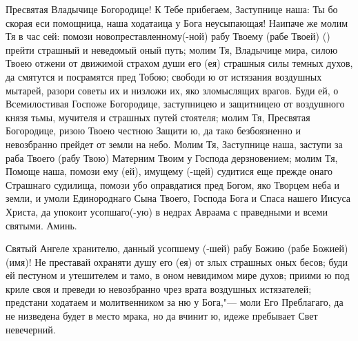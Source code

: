 \mychapterending

\begin{mymulticols}
 

Пресвятая Владычице Богородице! К Тебе прибегаем, Заступнице наша: Ты бо скорая еси помощница, наша ходатаица у Бога неусыпающая! Наипаче же молим Тя в час сей: помози новопреставленному(-ной) рабу Твоему (рабе Твоей) () прейти страшный и неведомый оный путь; молим Тя, Владычице мира, силою Твоею отжени от движимой страхом души его (ея) страшныя силы темных духов, да смятутся и посрамятся пред Тобою; свободи ю от истязания воздушных мытарей, разори советы их и низложи их, яко зломыслящих врагов. Буди ей, о Всемилостивая Госпоже Богородице, заступницею и защитницею от воздушного князя тьмы, мучителя и страшных путей стоятеля; молим Тя, Пресвятая Богородице, ризою Твоею честною Защити ю, да тако безбоязненно и невозбранно прейдет от земли на небо. Молим Тя, Заступнице наша, заступи за раба Твоего (рабу Твою) Матерним Твоим у Господа дерзновением; молим Тя, Помоще наша, помози ему (ей), имущему (-щей) судитися еще прежде онаго Страшнаго судилища, помози убо оправдатися пред Богом, яко Творцем неба и земли, и умоли Единороднаго Сына Твоего, Господа Бога и Спаса нашего Иисуса Христа, да упокоит усопшаго(-ую) в недрах Авраама с праведными и всеми святыми. Аминь.

\end{mymulticols}

\mychapterending

\begin{mymulticols}
 

Святый Ангеле хранителю, данный усопшему (-шей) рабу Божию (рабе Божией) (имя)! Не преставай охраняти душу его (ея) от злых страшных оных бесов; буди ей пестуном и утешителем и тамо, в оном невидимом мире духов; приими ю под криле своя и преведи ю невозбранно чрез врата воздушных истязателей; предстани ходатаем и молитвенником за ню у Бога,"--- моли Его Преблагаго, да не низведена будет в место мрака, но да вчинит ю, идеже пребывает Свет невечерний. 

\end{mymulticols}

\mychapterending

